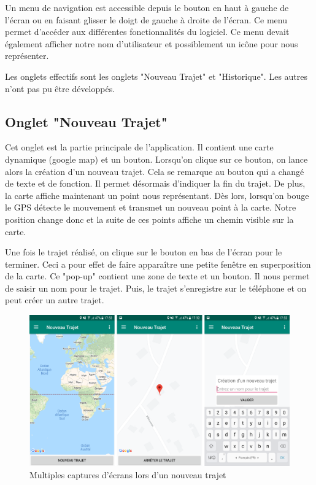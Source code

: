 Un menu de navigation est accessible depuis le bouton en haut à gauche de l'écran ou en faisant glisser le doigt de gauche à droite de l'écran.
Ce menu permet d'accéder aux différentes fonctionnalités du logiciel. Ce menu devait également afficher notre nom d'utilisateur et
possiblement un icône pour nous représenter.

Les onglets effectifs sont les onglets "Nouveau Trajet" et "Historique". Les autres n'ont pas pu être développés.
\vspace{30pt}
\subsection{Onglet "Nouveau Trajet"}
Cet onglet est la partie principale de l'application. Il contient une carte dynamique (google map) et un bouton. Lorsqu'on clique sur ce
bouton, on lance alors la création d'un nouveau trajet. Cela se remarque au bouton qui a changé de texte et de fonction. Il permet
désormais d'indiquer la fin du trajet. De plus, la carte affiche maintenant un point nous représentant. Dès lors, lorsqu'on bouge
le GPS détecte le mouvement et transmet un nouveau point à la carte. Notre position change donc et la suite de ces points affiche un chemin visible
sur la carte.

Une fois le trajet réalisé, on clique sur le bouton en bas de l'écran pour le terminer. Ceci a pour effet de faire apparaître une
petite fenêtre en superposition de la carte. Ce "pop-up" contient une zone de texte et un bouton. Il nous permet de saisir un nom pour
le trajet. Puis, le trajet s'enregistre sur le téléphone et on peut créer un autre trajet.
\begin{figure}[ht]
  \label{Nouveau trajet}
  \centering
  \includegraphics[scale=0.11]{images/nouveau-trajet.png}
  \caption{Multiples captures d'écrans lors d'un nouveau trajet}
\end{figure}

